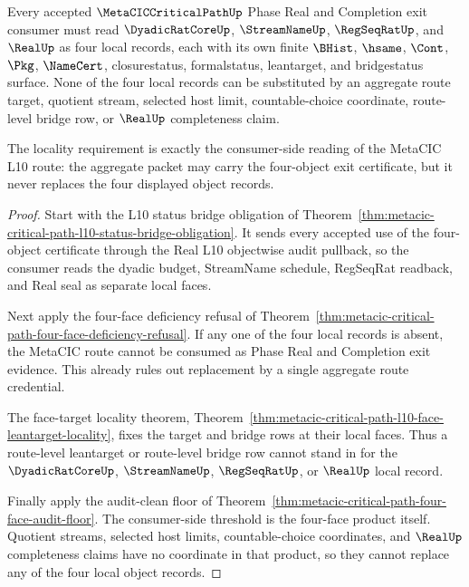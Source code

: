 \begin{theorem}
\label{thm:metacic-critical-path-l10-four-object-locality}
Every accepted $\MetaCICCriticalPathUp$ Phase Real and Completion exit consumer must read $\DyadicRatCoreUp$, $\StreamNameUp$, $\RegSeqRatUp$, and $\RealUp$ as four local records, each with its own finite $\BHist$, $\hsame$, $\Cont$, $\Pkg$, $\NameCert$, closurestatus, formalstatus, leantarget, and bridgestatus surface. None of the four local records can be substituted by an aggregate route target, quotient stream, selected host limit, countable-choice coordinate, route-level bridge row, or $\RealUp$ completeness claim.

The locality requirement is exactly the consumer-side reading of the MetaCIC L10 route: the aggregate packet may carry the four-object exit certificate, but it never replaces the four displayed object records.
\end{theorem}
\begin{proof}
Start with the L10 status bridge obligation of Theorem~\ref{thm:metacic-critical-path-l10-status-bridge-obligation}. It sends every accepted use of the four-object certificate through the Real L10 objectwise audit pullback, so the consumer reads the dyadic budget, StreamName schedule, RegSeqRat readback, and Real seal as separate local faces.

Next apply the four-face deficiency refusal of Theorem~\ref{thm:metacic-critical-path-four-face-deficiency-refusal}. If any one of the four local records is absent, the MetaCIC route cannot be consumed as Phase Real and Completion exit evidence. This already rules out replacement by a single aggregate route credential.

The face-target locality theorem, Theorem~\ref{thm:metacic-critical-path-l10-face-leantarget-locality}, fixes the target and bridge rows at their local faces. Thus a route-level leantarget or route-level bridge row cannot stand in for the $\DyadicRatCoreUp$, $\StreamNameUp$, $\RegSeqRatUp$, or $\RealUp$ local record.

Finally apply the audit-clean floor of Theorem~\ref{thm:metacic-critical-path-four-face-audit-floor}. The consumer-side threshold is the four-face product itself. Quotient streams, selected host limits, countable-choice coordinates, and $\RealUp$ completeness claims have no coordinate in that product, so they cannot replace any of the four local object records.
\end{proof}

